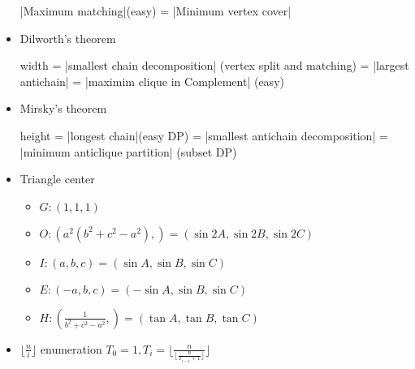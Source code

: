 \begin{itemize}
    |Maximum matching|(easy) = |Minimum vertex cover|

    \item Dilworth's theorem

    width = |smallest chain decomposition| (vertex split and matching) = |largest antichain| = |maximim clique in Complement| (easy)

    \item Mirsky's theorem

    height = |longest chain|(easy DP) = |smallest antichain decomposition| = |minimum anticlique partition| (subset DP)

    \item Triangle center
    
    \begin{itemize}
    \item $G : (1,1,1)$
    \item $O : (a^2(b^2+c^2-a^2),)=(\sin 2A, \sin 2B, \sin 2C)$
    \item $I : (a,b,c)=(\sin A, \sin B, \sin C)$
    \item $E : (-a, b, c)=(-\sin A, \sin B, \sin C)$
    \item $H : (\frac{1}{b^2+c^2-a^2},)=(\tan A,\tan B,\tan C)$
	\end{itemize}
	
	\item $\lfloor \frac{n}{i} \rfloor$ enumeration
	$T_0=1, T_i = \lfloor \frac{n}{\lfloor \frac{n}{T_{i-1}+1}\rfloor } \rfloor$

    

\end{itemize}
